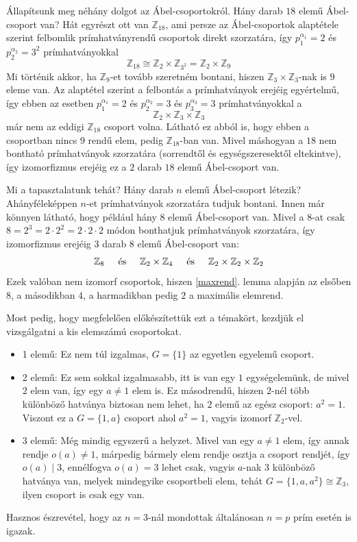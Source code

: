 \documentclass[12pt]{book}
\theoremstyle{plain} %
\theoremstyle{definition} %
\theoremstyle{remark}
\numberwithin{equation}{section}  %
\def\Z{\mathbb{Z}}
\begin{document}
	Állapítsunk meg néhány dolgot az Ábel-csoportokról. Hány darab $18$ elemű Ábel-csoport van? Hát egyrészt ott van $\Z_{18}$, ami persze az Ábel-csoportok alaptétele szerint felbomlik prímhatványrendű csoportok direkt szorzatára, így $p_1^{\alpha_1} = 2$ és $p_2^{\alpha_2} = 3^2$ prímhatványokkal
	\[ \Z_{18} \cong \Z_2 \times \Z_{3^2} = \Z_2 \times \Z_9  \]
	Mi történik akkor, ha $\Z_9$-et tovább szeretném bontani, hiszen $\Z_3\times \Z_3$-nak is $9$ eleme van. Az alaptétel szerint a felbontás a prímhatványok erejéig egyértelmű, így ebben az esetben $p_1^{\alpha_1} = 2$ és $p_2^{\alpha_2} = 3$ és $p_3^{\alpha_3} = 3$ prímhatványokkal a
	\[ \Z_2 \times \Z_3 \times \Z_3  \]
	már nem az eddigi $\Z_{18}$ csoport volna. Látható ez abból is, hogy ebben a csoportban nincs $9$ rendű elem, pedig $\Z_{18}$-ban van. Mivel máshogyan a $18$ nem bontható prímhatványok szorzatára (sorrendtől és egységszeresektől eltekintve), így izomorfizmus erejéig ez a $2$ darab $18$ elemű Ábel-csoport van.
	
	Mi a tapasztalatunk tehát? Hány darab $n$ elemű Ábel-csoport létezik? Ahányféleképpen $n$-et prímhatványok szorzatára tudjuk bontani. Innen már könnyen látható, hogy például hány $8$ elemű Ábel-csoport van. Mivel a $8$-at csak $8=2^3=2\cdot 2^2 = 2 \cdot 2 \cdot 2$ módon bonthatjuk prímhatványok szorzatára, így izomorfizmus erejéig $3$ darab $8$ elemű Ábel-csoport van:
	\[ \Z_8 \hspace{5mm} \text{és} \hspace{5mm} \Z_2\times \Z_4 \hspace{5mm} \text{és} \hspace{5mm} \Z_2\times \Z_2 \times \Z_2   \]
	Ezek valóban nem izomorf csoportok, hiszen \ref{maxrend}. lemma alapján az elsőben $8$, a másodikban $4$, a harmadikban pedig $2$ a maximális elemrend.
	
	Most pedig, hogy megfelelően előkészítettük ezt a témakört, kezdjük el vizsgálgatni a kis elemszámú csoportokat.

	\begin{itemize}
		\item{1 elemű: Ez nem túl izgalmas, $G=\{1\}$ az egyetlen egyelemű csoport.
		}
		\item{2 elemű: Ez sem sokkal izgalmasabb, itt is van egy $1$ egységelemünk, de mivel $2$ elem van, így egy $a\neq 1$ elem is. Ez másodrendű, hiszen $2$-nél több különböző hatványa biztosan nem lehet, ha $2$ elemű az egész csoport: $a^2 = 1$. Viszont ez a $G=\{1,a\}$ csoport ahol $a^2=1$, vagyis izomorf $\Z_2$-vel.
		}
		\item{3 elemű: Még mindig egyszerű a helyzet. Mivel van egy $a\neq 1$ elem, így annak rendje $o(a)\neq 1$, márpedig bármely elem rendje osztja a csoport rendjét, így $o(a)\mid 3$, ennélfogva $o(a) = 3$ lehet csak, vagyis $a$-nak $3$ különböző hatványa van, melyek mindegyike csoportbeli elem, tehát $G=\{1,a,a^2\}\cong \Z_3$, ilyen csoport is csak egy van.
		}
	\end{itemize}
	Hasznos észrevétel, hogy az $n=3$-nál mondottak általánosan $n=p$ prím esetén is igazak.
	
\end{document}
